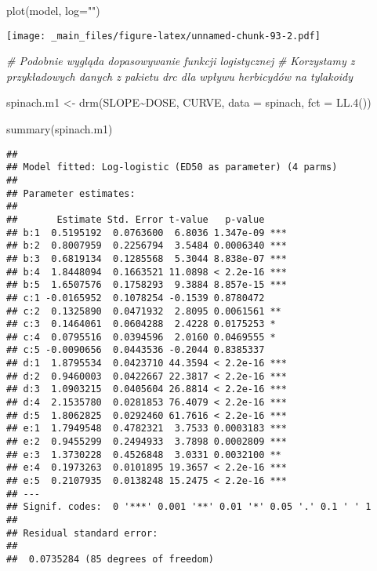 \documentclass[
]{book}
\newenvironment{Shaded}{\begin{snugshade}}{\end{snugshade}}
\newcommand{\AttributeTok}[1]{\textcolor[rgb]{0.77,0.63,0.00}{#1}}
\newcommand{\CommentTok}[1]{\textcolor[rgb]{0.56,0.35,0.01}{\textit{#1}}}
\newcommand{\FunctionTok}[1]{\textcolor[rgb]{0.00,0.00,0.00}{#1}}
\newcommand{\NormalTok}[1]{#1}
\newcommand{\OtherTok}[1]{\textcolor[rgb]{0.56,0.35,0.01}{#1}}
\newcommand{\SpecialCharTok}[1]{\textcolor[rgb]{0.00,0.00,0.00}{#1}}
\newcommand{\StringTok}[1]{\textcolor[rgb]{0.31,0.60,0.02}{#1}}
\begin{document}
\begin{Shaded}
\begin{Highlighting}[]
\FunctionTok{plot}\NormalTok{(model, }\AttributeTok{log=}\StringTok{""}\NormalTok{)}
\end{Highlighting}
\end{Shaded}

\texttt{[image: \_main\_files/figure-latex/unnamed-chunk-93-2.pdf]}

\begin{Shaded}
\begin{Highlighting}[]
\CommentTok{\# Podobnie wygląda dopasowywanie funkcji logistycznej}
\CommentTok{\# Korzystamy z przykładowych danych z pakietu drc dla wpływu herbicydów na tylakoidy}

\NormalTok{spinach.m1 }\OtherTok{\textless{}{-}} \FunctionTok{drm}\NormalTok{(SLOPE}\SpecialCharTok{\textasciitilde{}}\NormalTok{DOSE, CURVE, }\AttributeTok{data =}\NormalTok{ spinach, }\AttributeTok{fct =} \FunctionTok{LL.4}\NormalTok{())}

\FunctionTok{summary}\NormalTok{(spinach.m1)}
\end{Highlighting}
\end{Shaded}

\begin{verbatim}
## 
## Model fitted: Log-logistic (ED50 as parameter) (4 parms)
## 
## Parameter estimates:
## 
##       Estimate Std. Error t-value   p-value    
## b:1  0.5195192  0.0763600  6.8036 1.347e-09 ***
## b:2  0.8007959  0.2256794  3.5484 0.0006340 ***
## b:3  0.6819134  0.1285568  5.3044 8.838e-07 ***
## b:4  1.8448094  0.1663521 11.0898 < 2.2e-16 ***
## b:5  1.6507576  0.1758293  9.3884 8.857e-15 ***
## c:1 -0.0165952  0.1078254 -0.1539 0.8780472    
## c:2  0.1325890  0.0471932  2.8095 0.0061561 ** 
## c:3  0.1464061  0.0604288  2.4228 0.0175253 *  
## c:4  0.0795516  0.0394596  2.0160 0.0469555 *  
## c:5 -0.0090656  0.0443536 -0.2044 0.8385337    
## d:1  1.8795534  0.0423710 44.3594 < 2.2e-16 ***
## d:2  0.9460003  0.0422667 22.3817 < 2.2e-16 ***
## d:3  1.0903215  0.0405604 26.8814 < 2.2e-16 ***
## d:4  2.1535780  0.0281853 76.4079 < 2.2e-16 ***
## d:5  1.8062825  0.0292460 61.7616 < 2.2e-16 ***
## e:1  1.7949548  0.4782321  3.7533 0.0003183 ***
## e:2  0.9455299  0.2494933  3.7898 0.0002809 ***
## e:3  1.3730228  0.4526848  3.0331 0.0032100 ** 
## e:4  0.1973263  0.0101895 19.3657 < 2.2e-16 ***
## e:5  0.2107935  0.0138248 15.2475 < 2.2e-16 ***
## ---
## Signif. codes:  0 '***' 0.001 '**' 0.01 '*' 0.05 '.' 0.1 ' ' 1
## 
## Residual standard error:
## 
##  0.0735284 (85 degrees of freedom)
\end{verbatim}
\end{document}
